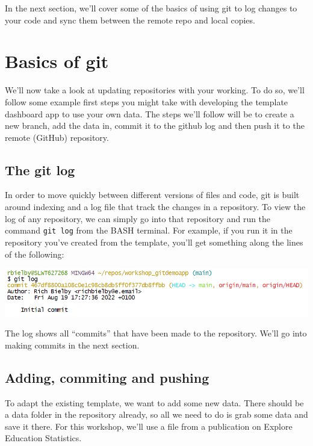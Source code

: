 \documentclass[
  12pt,
]{article}
\begin{document}
In the next section, we'll cover some of the basics of using git to log
changes to your code and sync them between the remote repo and local
copies.

\newpage

\hypertarget{basics-of-git}{%
\section{Basics of git}\label{basics-of-git}}

We'll now take a look at updating repositories with your working. To do
so, we'll follow some example first steps you might take with developing
the template dashboard app to use your own data. The steps we'll follow
will be to create a new branch, add the data in, commit it to the github
log and then push it to the remote (GitHub) repository.

\hypertarget{the-git-log}{%
\subsection{The git log}\label{the-git-log}}

In order to move quickly between different versions of files and code,
git is built around indexing and a log file that track the changes in a
repository. To view the log of any repository, we can simply go into
that repository and run the command \texttt{git\ log} from the BASH
terminal. For example, if you run it in the repository you've created
from the template, you'll get something along the lines of the
following:

\begin{center}\includegraphics[width=0.8\linewidth]{images/gitdemo/gitdemo-gitlog-1} \end{center}

The log shows all ``commits'' that have been made to the repository.
We'll go into making commits in the next section.

\hypertarget{adding-commiting-and-pushing}{%
\subsection{Adding, commiting and
pushing}\label{adding-commiting-and-pushing}}

To adapt the existing template, we want to add some new data. There
should be a data folder in the repository already, so all we need to do
is grab some data and save it there. For this workshop, we'll use a file
from a publication on Explore Education Statistics.
\end{document}
